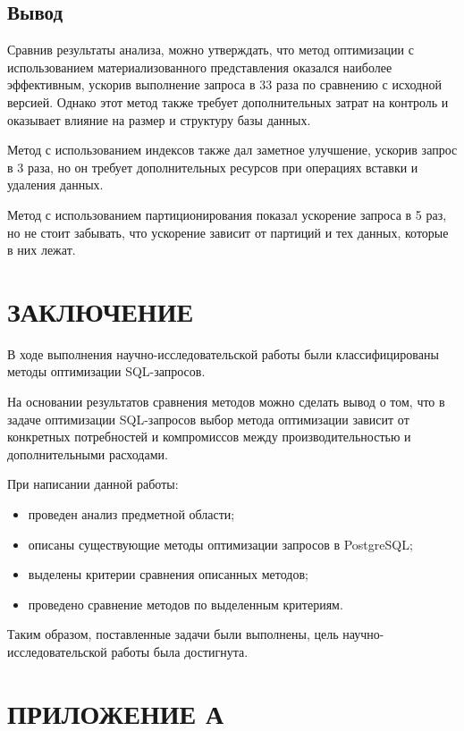 \documentclass{bmstu}
\begin{document}
\section{Вывод}
Сравнив результаты анализа, можно утверждать, что метод оптимизации с использованием материализованного представления оказался наиболее эффективным, ускорив выполнение запроса в 33 раза по сравнению с исходной версией. Однако этот метод также требует дополнительных затрат на контроль и оказывает влияние на размер и структуру базы данных.

Метод с использованием индексов также дал заметное улучшение, ускорив запрос в 3 раза, но он требует дополнительных ресурсов при операциях вставки и удаления данных.

Метод с использованием партиционирования показал ускорение запроса в 5 раз, но не стоит забывать, что ускорение зависит от партиций и тех данных, которые в них лежат.



\chapter*{ЗАКЛЮЧЕНИЕ}

В ходе выполнения научно-исследовательской работы были классифицированы методы 
оптимизации SQL-запросов.

На основании результатов сравнения методов можно сделать вывод о том, что в 
задаче оптимизации SQL-запросов выбор метода оптимизации зависит от конкретных потребностей 
и компромиссов между производительностью и дополнительными расходами.

При написании данной работы:

\begin{itemize}
	\item проведен анализ предметной области;
	\item описаны существующие методы оптимизации запросов в PostgreSQL;
	\item выделены критерии сравнения описанных методов;
	\item проведено сравнение методов по выделенным критериям.
\end{itemize}

Таким образом, поставленные задачи были выполнены, цель научно-исследовательской работы была достигнута.

\clearpage
\makebibliography

\chapter*{ПРИЛОЖЕНИЕ А}

\end{document}
